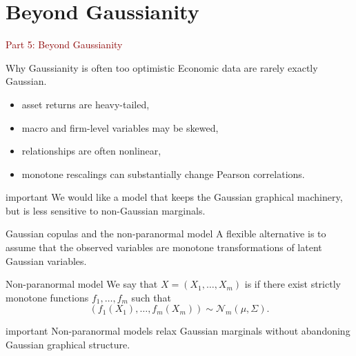 \documentclass[dvipsnames,aspectratio=169,handout]{beamer}
\begin{document}

\section{Beyond Gaussianity}

\begin{frame}{}
\begin{center}
{\Huge \textcolor{DarkRed}{Part 5: Beyond Gaussianity}}
\end{center}
\end{frame}

\begin{frame}{Why Gaussianity is often too optimistic}
Economic data are rarely exactly Gaussian.

\begin{itemize}
    \item asset returns are heavy-tailed,
    \item macro and firm-level variables may be skewed,
    \item relationships are often nonlinear,
    \item monotone rescalings can substantially change Pearson correlations.
\end{itemize}


\begin{beamercolorbox}[wd=\textwidth,sep=7pt,center,rounded=true,shadow=true]{important}
We would like a model that keeps the Gaussian graphical machinery,
but is less sensitive to non-Gaussian marginals.
\end{beamercolorbox}
\end{frame}


\begin{frame}{Gaussian copulas and the non-paranormal model}
A flexible alternative is to assume that the observed variables are monotone transformations of latent Gaussian variables.

\begin{block}{Non-paranormal model}
We say that $X=(X_1,\ldots,X_m)$ is  if there exist strictly monotone functions
$f_1,\ldots,f_m$ such that
\[
(f_1(X_1),\ldots,f_m(X_m))\sim \mathcal N_m(\mu,\Sigma).
\]
\end{block}
\medskip

\begin{beamercolorbox}[wd=\textwidth,sep=7pt,center,rounded=true,shadow=true]{important}
Non-paranormal models relax Gaussian marginals without abandoning Gaussian graphical structure.
\end{beamercolorbox}
\end{frame}
\end{document}
